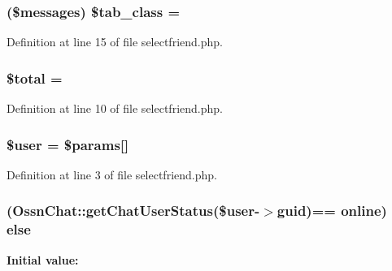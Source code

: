\subsubsection[{\texorpdfstring{\$tab\+\_\+class}{$tab_class}}]{ (\$messages) \$tab\+\_\+class = \textquotesingle{}\textquotesingle{}}\hypertarget{selectfriend_8php_a56538721d389f3e84d4d21ba66a2ec51}{}\label{selectfriend_8php_a56538721d389f3e84d4d21ba66a2ec51}


Definition at line 15 of file selectfriend.\+php.

\subsubsection[{\texorpdfstring{\$total}{$total}}]{\setlength{\rightskip}{0pt plus 5cm}\$total = \textquotesingle{}\textquotesingle{}}\hypertarget{selectfriend_8php_a241b818f48030b628685b2e5119c5624}{}\label{selectfriend_8php_a241b818f48030b628685b2e5119c5624}


Definition at line 10 of file selectfriend.\+php.

\subsubsection[{\texorpdfstring{\$user}{$user}}]{\setlength{\rightskip}{0pt plus 5cm}\${\bf user} = \$params\mbox{[}\textquotesingle{}\mbox{]}}\hypertarget{selectfriend_8php_a598ca4e71b15a1313ec95f0df1027ca5}{}\label{selectfriend_8php_a598ca4e71b15a1313ec95f0df1027ca5}


Definition at line 3 of file selectfriend.\+php.

\subsubsection[{\texorpdfstring{else}{else}}]{ ({\bf Ossn\+Chat\+::get\+Chat\+User\+Status}(\${\bf user}-\/$>$guid)== \textquotesingle{}online\textquotesingle{}) else}\hypertarget{selectfriend_8php_aec74c51e17ded8f77ce2edbcdf7ee80f}{}\label{selectfriend_8php_aec74c51e17ded8f77ce2edbcdf7ee80f}
{\bfseries Initial value\+:}


